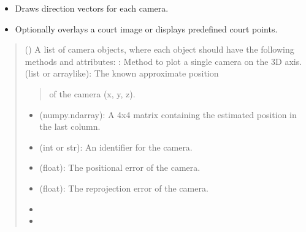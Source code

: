 \documentclass[letterpaper,10pt,english]{sphinxmanual}
\begin{document}
\begin{fulllineitems}
\begin{fulllineitems}
\begin{itemize}
\item {} 
\sphinxAtStartPar
Draws direction vectors for each camera.

\item {} 
\sphinxAtStartPar
Optionally overlays a court image or displays predefined court points.

\end{itemize}
\begin{quote}\begin{description}
\sphinxAtStartPar
{} () \textendash{} 
\sphinxAtStartPar
A list of camera objects, where each object should have the following methods
and attributes:
\sphinxhyphen{} : Method to plot a single camera on the 3D axis.
\sphinxhyphen{}  (list or array\sphinxhyphen{}like): The known approximate position
\begin{quote}

\sphinxAtStartPar
of the camera (x, y, z).
\end{quote}
\begin{itemize}
\item {} 
\sphinxAtStartPar
{} (numpy.ndarray): A 4x4 matrix containing the estimated position
in the last column.

\item {} 
\sphinxAtStartPar
{} (int or str): An identifier for the camera.

\item {} 
\sphinxAtStartPar
{} (float): The positional error of the camera.

\item {} 
\sphinxAtStartPar
{} (float): The re\sphinxhyphen{}projection error of the camera.

\end{itemize}


\sphinxAtStartPar
\begin{itemize}
\item {} 
\sphinxAtStartPar
{}

\item {} 
\sphinxAtStartPar
{}

\end{itemize}



\end{description}
\end{quote}
\end{fulllineitems}
\end{fulllineitems}
\end{document}
